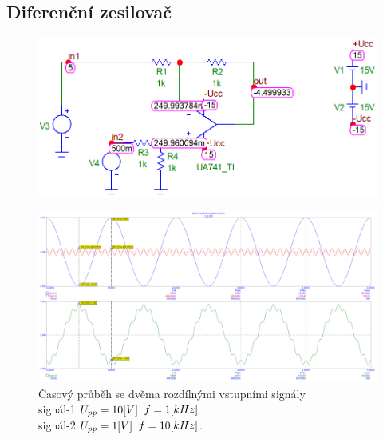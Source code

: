 \documentclass{article}
\begin{document}
\subsection*{Diferenční zesilovač}
\begin{figure}[H]
  \begin{minipage}[t]{\textwidth}
    \includegraphics[width=\textwidth]{PC/ukol3/DC.png}
  \end{minipage}
\end{figure}

\begin{figure}[H]
  \begin{minipage}[t]{\textwidth}
    \centering
    \includegraphics[width=\textwidth]{PC/ukol3/transient4.png}
    Časový průběh se dvěma rozdílnými vstupními signály \\
    signál-1 \(U_{pp} = 10\-[V]\) \(f = 1\-[kHz]\) \\
    signál-2 \(U_{pp} = 1\-[V]\) \(f = 10\-[kHz]\).
  \end{minipage}
\end{figure}
\end{document}
